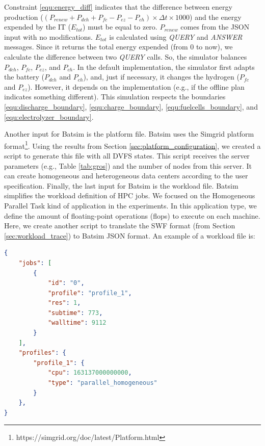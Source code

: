 Constraint \ref{equ:energy_diff} indicates that the difference between energy production ($(P_{renew} + P_{dch} + P_{fc} - P_{ez} - P_{ch}) \times \Delta t \times 1000$) and the energy expended by the IT ($E_{tot}$) must be equal to zero. $P_{renew}$ comes from the JSON input with no modifications. $E_{tot}$ is calculated using \textit{QUERY} and \textit{ANSWER} messages. Since it returns the total energy expended (from 0 to now), we calculate the difference between two \textit{QUERY} calls. So, the simulator balances $P_{dch}$,  $P_{fc}$, $P_{ez}$, and $P_{ch}$. In the default implementation, the simulator first adapts the battery ($P_{dch}$ and $P_{ch}$), and, just if necessary, it changes the hydrogen ($P_{fc}$ and $P_{ez}$).  However, it depends on the implementation (e.g., if the offline plan indicates something different). This simulation respects the boundaries \ref{equ:discharge_boundary}, \ref{equ:charge_boundary}, \ref{equ:fuelcells_boundary}, and \ref{equ:electrolyzer_boundary}.

Another input for Batsim is the platform file. Batsim uses the Simgrid platform format\footnote{https://simgrid.org/doc/latest/Platform.html}. Using the results from Section \ref{sec:platform_configuration}, we created a script to generate this file with all DVFS states. This script receives the server parameters (e.g., Table \ref{tab:gros}) and the number of nodes from this server. It can create homogeneous and heterogeneous data centers according to the user specification. Finally, the last input for Batsim is the workload file. Batsim simplifies the workload definition of HPC jobs. We focused on the Homogeneous Parallel Task kind of application in the experiments. In this application type, we define the amount of floating-point operations (flops) to execute on each machine. Here, we create another script to translate the SWF format (from Section \ref{sec:workload_trace}) to Batsim JSON format. An example of a workload file is:

\begin{lstlisting}[language=json,firstnumber=1]
{
    "jobs": [
        {
            "id": "0",
            "profile": "profile_1",
            "res": 1,
            "subtime": 773,
            "walltime": 9112
        }
    ],
    "profiles": {
        "profile_1": {
            "cpu": 163137000000000,
            "type": "parallel_homogeneous"
        }
    },
}       
\end{lstlisting}

